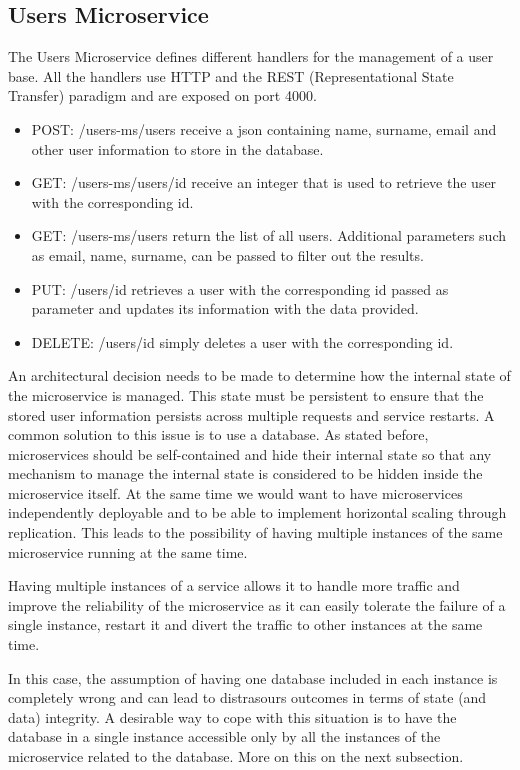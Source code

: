 \documentclass[manuscript,screen,review]{acmart}
\begin{document}
\subsection{Users Microservice}
The Users Microservice defines different handlers for the management of a user base. All the handlers use HTTP and the REST (Representational State Transfer) paradigm and are exposed on port 4000.

\begin{itemize}
    \item POST: /users-ms/users receive a json containing name, surname, email and other user information to store in the database.
    \item GET: /users-ms/users/{id} receive an integer that is used to retrieve the user with the corresponding id.
    \item GET: /users-ms/users return the list of all users. Additional parameters such as email, name, surname, can be passed to filter out the results.
    \item PUT: /users/{id} retrieves a user with the corresponding id passed as parameter and updates its information with the data provided.
    \item DELETE: /users/{id} simply deletes a user with the corresponding id.
\end{itemize}

An architectural decision needs to be made to determine how the internal state of the microservice is managed. This state must be persistent to ensure that the stored user information persists across multiple requests and service restarts. A common solution to this issue is to use a database.
As stated before, microservices should be self-contained and hide their internal state so that any mechanism to manage the internal state is considered to be hidden inside the microservice itself. At the same time we would want to have microservices independently deployable and to be able to implement horizontal scaling through replication. This leads to the possibility of having multiple instances of the same microservice running at the same time.

Having multiple instances of a service allows it to handle more traffic and improve the reliability of the microservice as it can easily tolerate the failure of a single instance, restart it and divert the traffic to other instances at the same time.

In this case, the assumption of having one database included in each instance is completely wrong and can lead to distrasours outcomes in terms of state (and data) integrity. A desirable way to cope with this situation is to have the database in a single instance accessible only by all the instances of the microservice related to the database. More on this on the next subsection.
\end{document}
